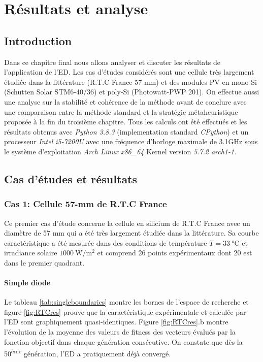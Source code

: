 \chapter{Résultats et analyse}

\section{Introduction}
Dans ce chapitre final nous allons analyser et discuter les résultats de l'application de l'ED. Les cas d'études considérés sont une cellule très largement étudiée dans la littérature (R.T.C France 57 mm) et des modules PV en mono-Si (Schutten Solar STM6-40/36) et poly-Si (Photowatt-PWP 201). On effectue aussi une analyse sur la stabilité et cohérence de la méthode avant de conclure avec une comparaison entre la méthode standard et la stratégie métaheuristique proposée à la fin du troisième chapitre. Tous les calculs ont été effectués et les résultats obtenus avec \textit{Python 3.8.3} (implementation standard \textit{CPython}) et un processeur \textit{Intel i5-7200U} avec une fréquence d'horloge maximale de 3.1\si{\giga\hertz} sous le système d'exploitation \textit{Arch Linux x86\_64} Kernel version \textit{5.7.2 arch1-1.}

\section{Cas d'études et résultats}
\subsection{Cas 1: Cellule 57-mm de R.T.C France}

  Ce premier cas d'étude concerne la cellule en silicium de R.T.C France avec un diamètre de 57 mm qui a été très largement étudiée dans la littérature. Sa courbe caractéristique a été mesurée dans des conditions de température $T = \SI{33}{\celsius}$ et irradiance solaire $\SI{1000}{\watt\per\square\meter}$ et comprend 26 points expérimentaux dont 20 est dans le premier quadrant. %

\subsubsection{Simple diode}

Le tableau \ref{tab:singleboundaries} montre les bornes de l'espace de recherche et figure \ref{fig:RTCres} prouve que la caractéristique expérimentale et calculée par l'ED sont graphiquement quasi-identiques. Figure \ref{fig:RTCres}.b montre l'évolution de la moyenne des valeurs de fitness des vecteurs évalués par la fonction objectif dans chaque génération consécutive. On constate que dès la 50\textsuperscript{ème} génération, l'ED a pratiquement déjà convergé.

